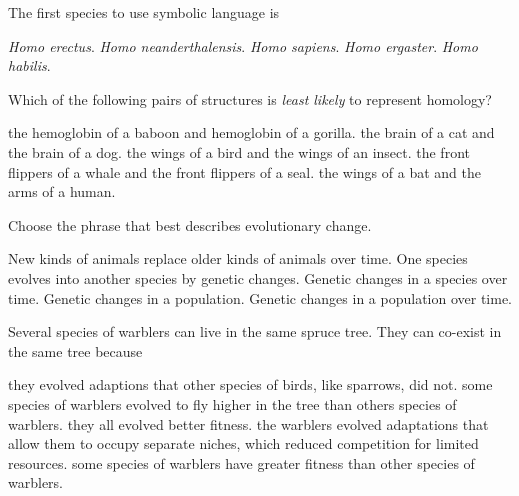 \question
The first species to use symbolic language is

\begin{choices}
\choice \textit{Homo erectus}.
\choice \textit{Homo neanderthalensis}.
\correctchoice \textit{Homo sapiens}.
\choice \textit{Homo ergaster}.
\choice \textit{Homo habilis}.
\end{choices}

\question
Which of the following pairs of structures is \textit{least likely} to represent homology?

\begin{choices}
\choice the hemoglobin of a baboon and hemoglobin of a gorilla.
\choice the brain of a cat and the brain of a dog.
\correctchoice the wings of a bird and the wings of an insect.
\choice the front flippers of a whale and the front flippers of a seal.
\choice the wings of a bat and the arms of a human.
\end{choices}

\question
Choose the phrase that best describes evolutionary change.

\begin{choices}
\choice New kinds of animals replace older kinds of animals over time.
\choice One species evolves into another species by genetic changes.
\choice Genetic changes in a species over time.
\choice Genetic changes in a population.
\correctchoice Genetic changes in a population over time.
\end{choices}

\question
Several species of warblers can live in the same spruce tree. They can co-exist in the same tree because

\begin{choices}
\choice they evolved adaptions that other species of birds, like sparrows, did not.
\choice some species of warblers evolved to fly higher in the tree than others species of warblers.
\choice they all evolved better fitness.
\correctchoice the warblers evolved adaptations that allow them to occupy separate niches, which reduced competition for limited resources.
\choice some species of warblers have greater fitness than other species of warblers.
\end{choices}
